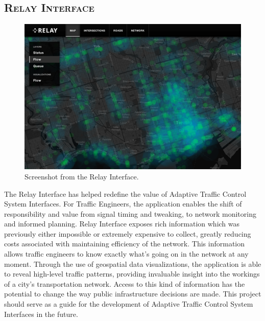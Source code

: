 \documentclass[a4paper,10pt]{article}
\begin{document}
\begin{multicols}{2}
\section{\textsc{Relay Interface}}

\begin{figure}[H]
  \begin{centering}
    \includegraphics[scale=0.45]{figures/flow-2.png}
    \caption{Screenshot from the Relay Interface.}
    \label{fig:interface}
  \end{centering}
\end{figure}

The Relay Interface has helped redefine the value of Adaptive Traffic Control System Interfaces. For Traffic Engineers, the application enables the shift of responsibility and value from signal timing and tweaking, to network monitoring and informed planning. Relay Interface exposes rich information which was previously either impossible or extremely expensive to collect, greatly reducing costs associated with maintaining efficiency of the network. This information allows traffic engineers to know exactly what's going on in the network at any moment. Through the use of geospatial data visualizations, the application is able to reveal high-level traffic patterns, providing invaluable insight into the workings of a city's transportation network. Access to this kind of information has the potential to change the way public infrastructure decisions are made. This project should serve as a guide for the development of Adaptive Traffic Control System Interfaces in the future.




\end{multicols}
\end{document}
